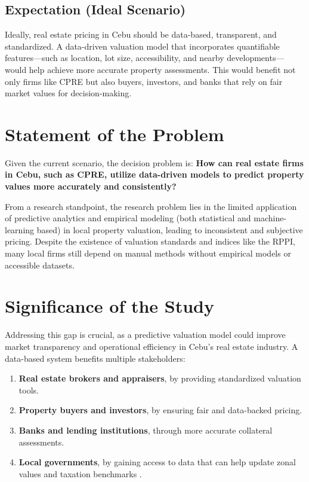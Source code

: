 \subsection{Expectation (Ideal Scenario)}

Ideally, real estate pricing in Cebu should be data-based, transparent, and standardized. A data-driven valuation model that incorporates quantifiable features—such as location, lot size, accessibility, and nearby developments—would help achieve more accurate property assessments. This would benefit not only firms like CPRE but also buyers, investors, and banks that rely on fair market values for decision-making.

\section{Statement of the Problem}

Given the current scenario, the decision problem is:
\textbf{How can real estate firms in Cebu, such as CPRE, utilize data-driven models to predict property values more accurately and consistently?}

From a research standpoint, the research problem lies in the limited application of predictive analytics and empirical modeling (both statistical and machine-learning based) in local property valuation, leading to inconsistent and subjective pricing. Despite the existence of valuation standards and indices like the RPPI, many local firms still depend on manual methods without empirical models or accessible datasets.

\section{Significance of the Study}

Addressing this gap is crucial, as a predictive valuation model could improve market transparency and operational efficiency in Cebu’s real estate industry. A data-based system benefits multiple stakeholders:

\begin{enumerate}
    \item \textbf{Real estate brokers and appraisers}, by providing standardized valuation tools.
    \item \textbf{Property buyers and investors}, by ensuring fair and data-backed pricing.
    \item \textbf{Banks and lending institutions}, through more accurate collateral assessments.
    \item \textbf{Local governments}, by gaining access to data that can help update zonal values and taxation benchmarks \parencite{bsp2025}.
\end{enumerate}

